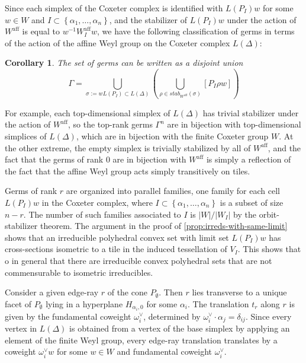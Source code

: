 \documentclass[11pt]{amsart}
\newtheorem{corollary}[theorem]{Corollary}
\numberwithin{table}{section}
\numberwithin{figure}{section}
\theoremstyle{remark}
\providecommand{\abs}[1]{\left\lvert#1\right\rvert}
\providecommand{\set}[1]{\left\lbrace#1\right\rbrace}
\newcommand{\Waff}[1][]{\ensuremath{W^{\mathrm{aff}}_{#1}}}
\renewcommand{\bold}[1]{\medskip \noindent {\bf #1 }\nopagebreak}
\begin{document}
Since each simplex of the Coxeter complex is identified with
$L(P_I) w$ for some $w\in W$ and
$I\subset \set{\alpha_1,\dotsc,\alpha_n}$, and the stabilizer of
$L(P_I) w$ under the action of $\Waff[]$ is equal to
$w^{-1} \Waff[I] w$, we have the following classification of germs in
terms of the action of the affine Weyl group on the Coxeter complex
$L(\Delta)$:

\begin{corollary} \label{cor:germclassification2}
  The set of germs can be written as a disjoint union
  \[
    \Gamma = \bigcup_{\sigma:= wL(P_I)\subset L(\Delta)} \left(
      \bigcup_{\rho \in stab_{\Waff[]}(\sigma)}  [P_I \rho w] \right)
  \]
\end{corollary}

For example, each top-dimensional simplex of $L(\Delta)$ has trivial
stabilizer under the action of $\Waff[]$, so the top-rank germs
$\Gamma^n$ are in bijection with top-dimensional simplices of
$L(\Delta)$, which are in bijection with the finite Coxeter group
$W$. At the other extreme, the empty simplex is trivially stabilized by
all of $\Waff[]$, and the fact that the germs of rank $0$ are in
bijection with $\Waff[]$ is simply a reflection of the fact that the
affine Weyl group acts simply transitively on tiles.

Germs of rank $r$ are organized into parallel families, one family for
each cell $L(P_I) w$ in the Coxeter complex, where
$I\subset \set{\alpha_1,\dotsc,\alpha_n}$ is a subset of size
$n-r$. The number of such families associated to $I$ is
$\abs{W} / \abs{W_I}$ by the orbit-stabilizer theorem. The argument in
the proof of \cref{prop:irreds-with-same-limit} shows that
an irreducible polyhedral convex set with limit set $L(P_I)w$ has
cross-sections isometric to a tile in the induced tessellation of
$V_I$. This shows that o in general that there are irreducible convex polyhedral sets
that are not commensurable to isometric irreducibles.


\bold{Canonical translations.} Consider a given edge-ray $r$ of the
cone $P_\emptyset$. Then $r$ lies transverse to a unique facet of
$P_\emptyset$ lying in a hyperplane $H_{\alpha_i,0}$ for some
$\alpha_i$. The translation $t_r$ along $r$ is given by the
fundamental coweight $\omega^\vee_i$, determined by
$\omega^\vee_i \cdot \alpha_j = \delta_{ij}$. Since every vertex in
$L(\Delta)$ is obtained from a vertex of the base simplex by applying
an element of the finite Weyl group, every edge-ray translation
translates by a coweight $\omega^\vee_i w$ for some $w\in W$ and
fundamental coweight $\omega^\vee_i$.
\end{document}

